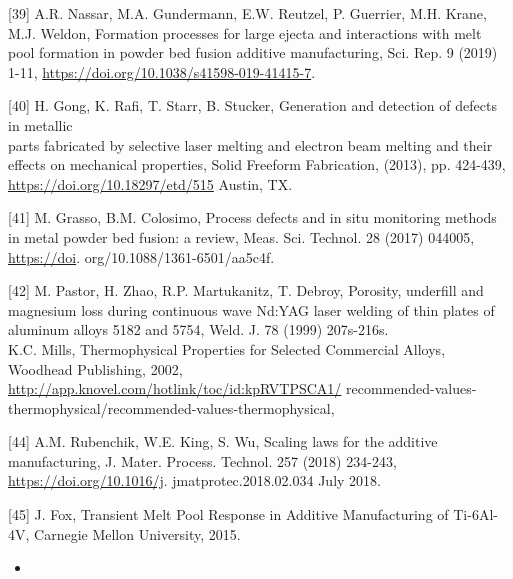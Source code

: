 \documentclass[10pt]{article}
\begin{document}
[39] A.R. Nassar, M.A. Gundermann, E.W. Reutzel, P. Guerrier, M.H. Krane, M.J. Weldon, Formation processes for large ejecta and interactions with melt pool formation in powder bed fusion additive manufacturing, Sci. Rep. 9 (2019) 1-11, \href{https://doi.org/10.1038/s41598-019-41415-7}{https://doi.org/10.1038/s41598-019-41415-7}.

[40] H. Gong, K. Rafi, T. Starr, B. Stucker, Generation and detection of defects in metallic\\
parts fabricated by selective laser melting and electron beam melting and their effects on mechanical properties, Solid Freeform Fabrication, (2013), pp. 424-439, \href{https://doi.org/10.18297/etd/515}{https://doi.org/10.18297/etd/515} Austin, TX.

[41] M. Grasso, B.M. Colosimo, Process defects and in situ monitoring methods in metal powder bed fusion: a review, Meas. Sci. Technol. 28 (2017) 044005, \href{https://doi}{https://doi}. org/10.1088/1361-6501/aa5c4f.

[42] M. Pastor, H. Zhao, R.P. Martukanitz, T. Debroy, Porosity, underfill and magnesium loss during continuous wave Nd:YAG laser welding of thin plates of aluminum alloys 5182 and 5754, Weld. J. 78 (1999) 207s-216s.\\
[43] K.C. Mills, Thermophysical Properties for Selected Commercial Alloys, Woodhead Publishing, 2002, \href{http://app.knovel.com/hotlink/toc/id:kpRVTPSCA1/}{http://app.knovel.com/hotlink/toc/id:kpRVTPSCA1/} recommended-values-thermophysical/recommended-values-thermophysical,

[44] A.M. Rubenchik, W.E. King, S. Wu, Scaling laws for the additive manufacturing, J. Mater. Process. Technol. 257 (2018) 234-243, \href{https://doi.org/10.1016/j}{https://doi.org/10.1016/j}. jmatprotec.2018.02.034 July 2018.

[45] J. Fox, Transient Melt Pool Response in Additive Manufacturing of Ti-6Al-4V, Carnegie Mellon University, 2015.

\begin{itemize}
  \item 
\end{itemize}
\end{document}
